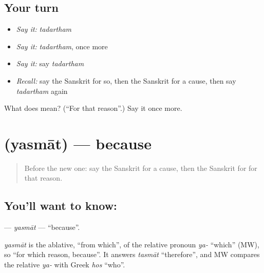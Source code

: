 \subsection*{Your turn}
\begin{itemize}
\raggedright
  \item \emph{Say it:} \emph{tadartham}
  \item \emph{Say it:} \emph{tadartham}, once more
  \item \emph{Say it:} say \emph{tadartham}
  \item \emph{Recall:} say the Sanskrit for so, then the Sanskrit for a cause, then say \emph{tadartham} again
\end{itemize}

\begin{tcolorbox}[breakable,colback=teal!4,colframe=teal!35!black,title={Before you move on}]
What does  mean? (\textquotedblleft{}For that reason\textquotedblright{}.) Say it once more.
\end{tcolorbox}
\section[\texorpdfstring{\sk{यस्मात्} (yasmāt)}{यस्मात् (yasmāt)}]{ (yasmāt) — because}

\label{lesson:SA-C98-yasmat}



\begin{quote}
Before the new one: say the Sanskrit for a cause, then the Sanskrit for for that reason.
\end{quote}

\subsection*{You'll want to know: }
\textbf{} — \emph{yasmāt} — \textquotedblleft{}because\textquotedblright{}.

\begin{cousinweb}
\emph{yasmāt} is the ablative, \textquotedblleft{}from which\textquotedblright{}, of the relative pronoun \emph{ya-} \textquotedblleft{}which\textquotedblright{} (MW), so \textquotedblleft{}for which reason, because\textquotedblright{}. It answers \emph{tasmāt} \textquotedblleft{}therefore\textquotedblright{}, and MW compares the relative \emph{ya-} with Greek \emph{hos} \textquotedblleft{}who\textquotedblright{}.
\end{cousinweb}

